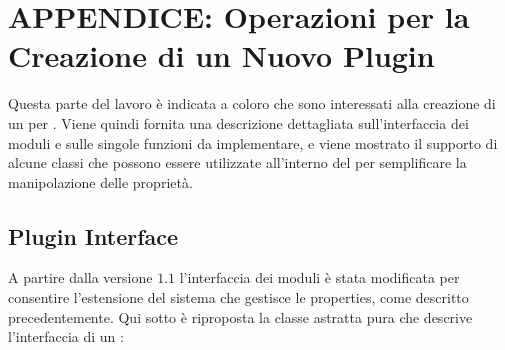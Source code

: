 \chapter*{APPENDICE: Operazioni per la Creazione di un Nuovo Plugin}


\label{appendice_a}


Questa parte del lavoro è indicata a coloro che sono interessati alla creazione di un \plugin{} per \visualnetkit{}. Viene quindi fornita una descrizione dettagliata sull'interfaccia dei moduli e sulle singole funzioni da implementare, e viene mostrato il supporto di alcune classi che possono essere utilizzate all'interno del \plugin{} per semplificare la manipolazione delle proprietà.

\section*{Plugin Interface}
A partire dalla versione $1.1$ l'interfaccia dei moduli è stata modificata per consentire l'estensione del sistema che gestisce le properties, come descritto precedentemente. Qui sotto è riproposta la classe astratta pura che descrive l'interfaccia di un \plugin{}:

